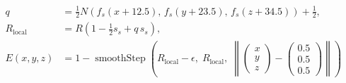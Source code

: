 \documentclass[border=6pt]{standalone}
\begin{document}
\color{black}
\(\displaystyle
\begin{aligned}
q &= \frac{1}{2}N\!\left(f_s(x+12.5),\,f_s(y+23.5),\,f_s(z+34.5)\right)+\frac{1}{2},\\
R_{\mathrm{local}} &= R\left(1-\frac{1}{2}s_s+q\,s_s\right),\\
E(x,y,z) &= 1-\operatorname{smoothStep}
\left(R_{\mathrm{local}}-\epsilon,\;R_{\mathrm{local}},\;
\left\|\begin{pmatrix}x\\y\\z\end{pmatrix}
-\begin{pmatrix}0.5\\0.5\\0.5\end{pmatrix}\right\|\right)
\end{aligned}
\)
\end{document}
